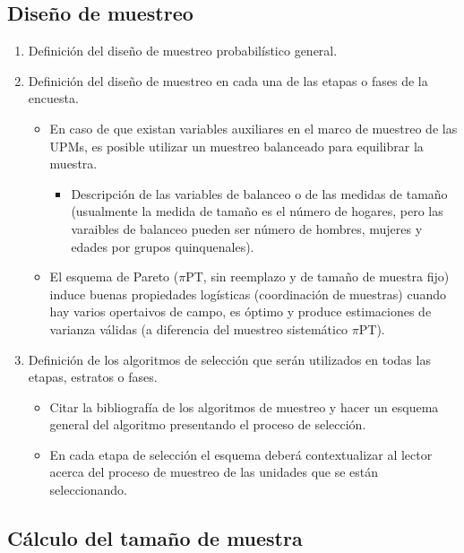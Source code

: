 \hypertarget{diseno-de-muestreo}{%
\subsection*{Diseño de muestreo}\label{diseno-de-muestreo}}


\begin{enumerate}
\def\labelenumi{\arabic{enumi}.}
\tightlist
\item
  Definición del diseño de muestreo probabilístico general.
\item
  Definición del diseño de muestreo en cada una de las etapas o fases de la encuesta.

  \begin{itemize}
  \tightlist
  \item
    En caso de que existan variables auxiliares en el marco de muestreo de las UPMs, es posible utilizar un muestreo balanceado para equilibrar la muestra.

    \begin{itemize}
    \tightlist
    \item
      Descripción de las variables de balanceo o de las medidas de tamaño (usualmente la medida de tamaño es el número de hogares, pero las varaibles de balanceo pueden ser número de hombres, mujeres y edades por grupos quinquenales).
    \end{itemize}
  \item
    El esquema de Pareto (\(\pi\)PT, sin reemplazo y de tamaño de muestra fijo) induce buenas propiedades logísticas (coordinación de muestras) cuando hay varios opertaivos de campo, es óptimo y produce estimaciones de varianza válidas (a diferencia del muestreo sistemático \(\pi\)PT).
  \end{itemize}
\item
  Definición de los algoritmos de selección que serán utilizados en todas las etapas, estratos o fases.

  \begin{itemize}
  \tightlist
  \item
    Citar la bibliografía de los algoritmos de muestreo y hacer un esquema general del algoritmo presentando el proceso de selección.
  \item
    En cada etapa de selección el esquema deberá contextualizar al lector acerca del proceso de muestreo de las unidades que se están seleccionando.
  \end{itemize}
\end{enumerate}

\hypertarget{calculo-del-tamano-de-muestra}{%
\subsection*{Cálculo del tamaño de muestra}\label{calculo-del-tamano-de-muestra}}


